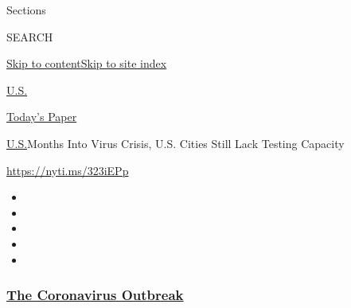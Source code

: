 Sections

SEARCH

\protect\hyperlink{site-content}{Skip to
content}\protect\hyperlink{site-index}{Skip to site index}

\href{https://www.nytimes3xbfgragh.onion/section/us}{U.S.}

\href{https://myaccount.nytimes3xbfgragh.onion/auth/login?response_type=cookie\&client_id=vi}{}

\href{https://www.nytimes3xbfgragh.onion/section/todayspaper}{Today's
Paper}

\href{/section/us}{U.S.}\textbar{}Months Into Virus Crisis, U.S. Cities
Still Lack Testing Capacity

\url{https://nyti.ms/323iEPp}

\begin{itemize}
\item
\item
\item
\item
\item
\end{itemize}

\hypertarget{the-coronavirus-outbreak}{%
\subsubsection{\texorpdfstring{\href{https://www.nytimes3xbfgragh.onion/news-event/coronavirus?name=styln-coronavirus-national\&region=TOP_BANNER\&block=storyline_menu_recirc\&action=click\&pgtype=Article\&impression_id=9ed14ec0-f2d3-11ea-a7cf-ab4cec2f2ffa\&variant=undefined}{The
Coronavirus
Outbreak}}{The Coronavirus Outbreak}}\label{the-coronavirus-outbreak}}

